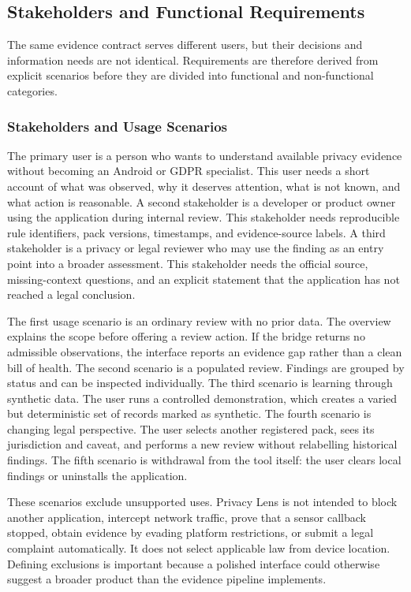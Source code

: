 \subsection{Stakeholders and Functional Requirements}

The same evidence contract serves different users, but their decisions and information needs are not identical. Requirements are therefore derived from explicit scenarios before they are divided into functional and non-functional categories.

\subsubsection{Stakeholders and Usage Scenarios}

The primary user is a person who wants to understand available privacy evidence without becoming an Android or GDPR specialist. This user needs a short account of what was observed, why it deserves attention, what is not known, and what action is reasonable. A second stakeholder is a developer or product owner using the application during internal review. This stakeholder needs reproducible rule identifiers, pack versions, timestamps, and evidence-source labels. A third stakeholder is a privacy or legal reviewer who may use the finding as an entry point into a broader assessment. This stakeholder needs the official source, missing-context questions, and an explicit statement that the application has not reached a legal conclusion.

The first usage scenario is an ordinary review with no prior data. The overview explains the scope before offering a review action. If the bridge returns no admissible observations, the interface reports an evidence gap rather than a clean bill of health. The second scenario is a populated review. Findings are grouped by status and can be inspected individually. The third scenario is learning through synthetic data. The user runs a controlled demonstration, which creates a varied but deterministic set of records marked as synthetic. The fourth scenario is changing legal perspective. The user selects another registered pack, sees its jurisdiction and caveat, and performs a new review without relabelling historical findings. The fifth scenario is withdrawal from the tool itself: the user clears local findings or uninstalls the application.

These scenarios exclude unsupported uses. Privacy Lens is not intended to block another application, intercept network traffic, prove that a sensor callback stopped, obtain evidence by evading platform restrictions, or submit a legal complaint automatically. It does not select applicable law from device location. Defining exclusions is important because a polished interface could otherwise suggest a broader product than the evidence pipeline implements.

